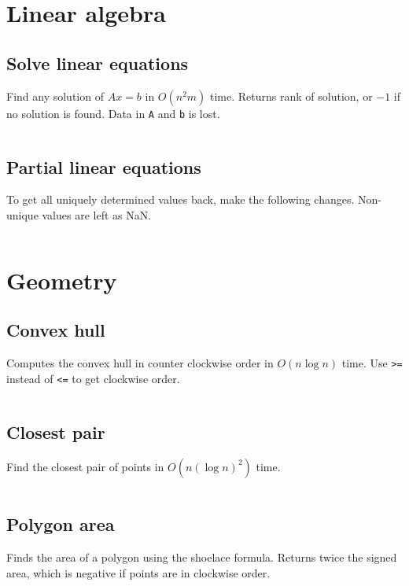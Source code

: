 \documentclass[10pt,a4paper,landscape,oneside]{amsart}
\newcommand{\code}[1]{\inputminted[fontsize=\large,tabsize=2,baselinestretch=1]{java}{#1}}
\begin{document}
\begin{multicols*}{2}
\section{Linear algebra}
\subsection{Solve linear equations}
Find any solution of \(Ax = b\) in \(O(n^2m)\) time. Returns rank of solution, or \(-1\)
if no solution is found. Data in \texttt{A} and \texttt{b} is lost.
\code{linear-algebra/linear-system.java}
\subsection{Partial linear equations}
To get all uniquely determined values back, make the following changes. Non-unique values
are left as NaN.
\code{linear-algebra/partial-linear-system.java}

\section{Geometry}
\subsection{Convex hull}
Computes the convex hull in counter clockwise order in \(O(n \log n)\) time.
Use \verb|>=| instead of \verb|<=| to get clockwise order.
\code{geometry/convex-hull.java}
\subsection{Closest pair}
Find the closest pair of points in \(O(n (\log n)^2)\) time.
\code{geometry/closest-pair.java}
\subsection{Polygon area}
Finds the area of a polygon using the shoelace formula. Returns twice the signed area,
which is negative if points are in clockwise order.
\code{geometry/polygon-area.java}

\end{multicols*}
\end{document}
